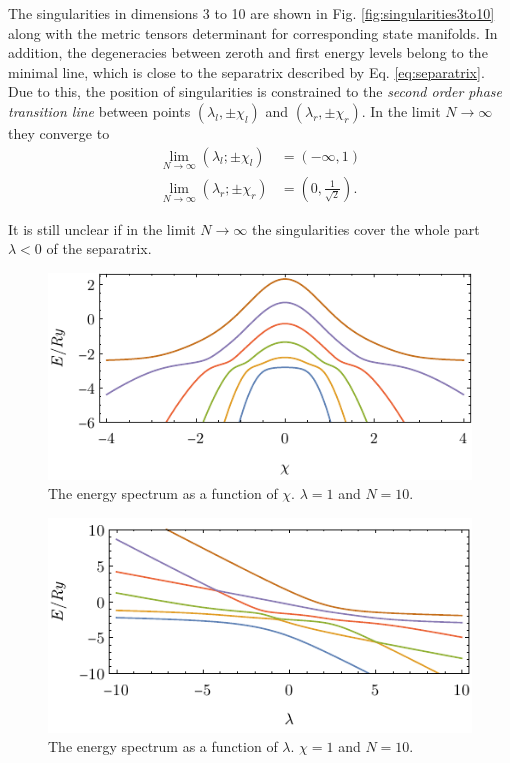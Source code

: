 The singularities in dimensions 3 to 10 are shown in Fig. \ref{fig:singularities3to10} along with the metric tensors determinant for corresponding state manifolds.
In addition, the degeneracies between zeroth and first energy levels belong to the minimal line, which is close to the separatrix described by Eq. \ref{eq:separatrix}. Due to this, the position of singularities is constrained to the \emph{second order phase transition line} between points $(\lambda_l,\pm\chi_l)$ and $(\lambda_r,\pm\chi_r)$. In the limit $N\rightarrow\infty$ they converge to
\begin{align*}
    \lim_{N\rightarrow \infty}(\lambda_l ;\pm\chi_l)&= \left(-\infty,1\right)\\
    \lim_{N\rightarrow \infty}(\lambda_r ;\pm\chi_r)&= \left(0,\frac{1}{\sqrt{2}}\right).
\end{align*}

It is still unclear if in the limit $N\rightarrow \infty$ the singularities cover the whole part $\lambda<0$ of the separatrix.



\begin{figure}[h]
    \centering
    \includegraphics[scale=1.4]{../img/N=10_energiesl.pdf}
    \vspace{-1pt}\caption{The energy spectrum as a function of $\chi$. $\lambda=1$ and $N=10$.}
    \label{fig:N=10_energiesl}    
\end{figure}
\begin{figure}[h]
    \centering
    \vspace{-18pt}\includegraphics[scale=1.4]{../img/N=10_energies2.pdf}
    \vspace{-1pt}\caption{The energy spectrum as a function of $\lambda$. $\chi=1$ and $N=10$.}
    \label{fig:N=10_energies2}    
\end{figure}


